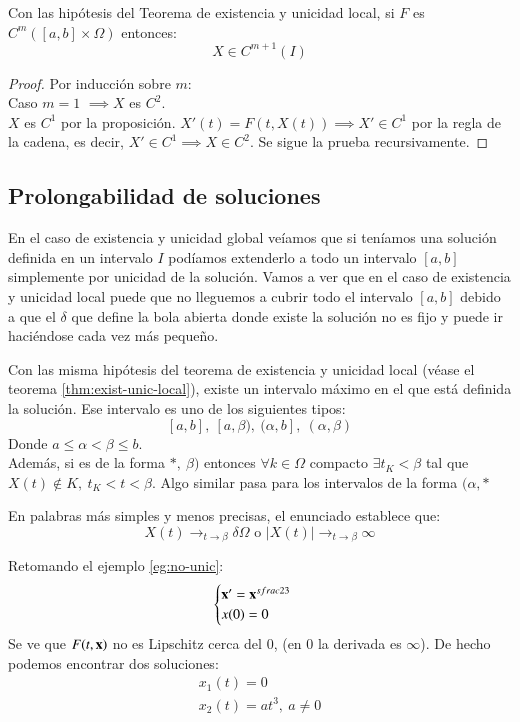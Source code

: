 \begin{pro}
    Con las hipótesis del Teorema de existencia y unicidad local, si $F$ es $C^m ([a,b]\times\Omega)$ entonces:
    $$
        X \in C^{m+1}(I)
    $$
\end{pro}
\begin{proof}
    Por inducción sobre $m$:\\
    Caso $m=1$ $\implies X$ es $C^2$.\\
    $X$ es $C^1$ por la proposición. $X'(t) = F(t, X(t)) \implies X' \in C^1$ por la regla de la cadena, es decir, $X' \in C^1 \implies X \in C^2$. Se sigue la prueba recursivamente.
\end{proof}

\subsection{Prolongabilidad de soluciones}
En el caso de existencia y unicidad global veíamos que si teníamos una solución definida en un intervalo $I$ podíamos extenderlo a todo un intervalo $[a, b]$ simplemente por unicidad de la solución. Vamos a ver que en el caso de existencia y unicidad local puede que no lleguemos a cubrir todo el intervalo $[a, b]$ debido a que el $\delta$ que define la bola abierta donde existe la solución no es fijo y puede ir haciéndose cada vez más pequeño.

\begin{pro}
    Con las misma hipótesis del teorema de existencia y unicidad local (véase el teorema \ref{thm:exist-unic-local}), existe un intervalo máximo en el que está definida la solución. Ese intervalo es uno de los siguientes tipos:
    $$[a, b],\ [a,\beta),\ (\alpha, b],\ (\alpha, \beta)
    $$
    Donde $a \leq \alpha < \beta \leq b$.\\
    Además, si es de la forma $*,\ \beta)$ entonces $\forall k \in \Omega$ compacto $\exists t_K < \beta$ tal que $X(t)\not \in K,\ t_K < t < \beta$. Algo similar pasa para los intervalos de la forma $(\alpha, *$
\end{pro}
\begin{obs}
    En palabras más simples y menos precisas, el enunciado establece que:
    $$
        X(t) \to_{t\to\beta} \delta \Omega \text{ o } |X(t)| \to_{t\to\beta} \infty
    $$
\end{obs}
\begin{eg}
    Retomando el ejemplo \ref{eg:no-unic}:
    $$
        \begin{cases}
            \mathbf{x}' = \mathbf{x}^{sfrac{2}{3}}\\
            x(0) = 0
        \end{cases}
    $$
    Se ve que $F(t, \mathbf{x})$ no es Lipschitz cerca del $0$, (en $0$ la derivada es $\infty$). De hecho podemos encontrar dos soluciones:
    \begin{gather*}
        x_1(t) = 0\\
        x_2(t) = at^3,\ a \neq 0
    \end{gather*}
\end{eg}


